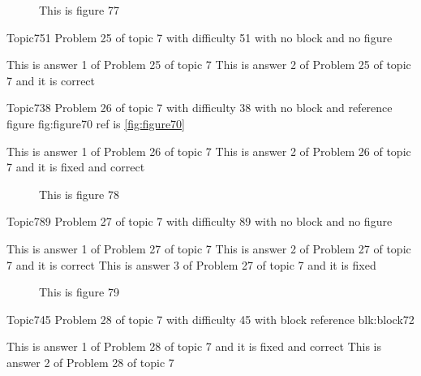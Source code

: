 \documentclass[master]{exam}
\begin{document}
\begin{figure}
	\begin{center}
		This is figure 77 
		\label{fig:figure77}
	\end{center}
\end{figure}

\begin{problem}{Topic7}{51}
	Problem 25 of topic 7 with difficulty 51 with no block and no figure
	\begin{answers}
		\answer This is answer 1 of Problem 25 of topic 7 
		\answer[correct] This is answer 2 of Problem 25 of topic 7 and it is correct
	\end{answers}
\end{problem}

\begin{problem}{Topic7}{38}
	Problem 26 of topic 7 with difficulty 38 with no block and reference figure fig:figure70 ref is \ref{fig:figure70}
	\begin{answers}
		\answer This is answer 1 of Problem 26 of topic 7 
		 This is answer 2 of Problem 26 of topic 7 and it is fixed and correct
	\end{answers}
\end{problem}



\begin{figure}
	\begin{center}
		This is figure 78 
		\label{fig:figure78}
	\end{center}
\end{figure}

\begin{problem}{Topic7}{89}
	Problem 27 of topic 7 with difficulty 89 with no block and no figure
	\begin{answers}
		\answer This is answer 1 of Problem 27 of topic 7 
		\answer[correct] This is answer 2 of Problem 27 of topic 7 and it is correct
		\answer[fixed] This is answer 3 of Problem 27 of topic 7 and it is fixed
	\end{answers}
\end{problem}



\begin{figure}
	\begin{center}
		This is figure 79 
		\label{fig:figure79}
	\end{center}
\end{figure}

\begin{problem}[requires=blk:block72]{Topic7}{45}
	Problem 28 of topic 7 with difficulty 45 with block reference blk:block72
	\begin{answers}
		 This is answer 1 of Problem 28 of topic 7 and it is fixed and correct
		\answer This is answer 2 of Problem 28 of topic 7 
	\end{answers}
\end{problem}
\end{document}
